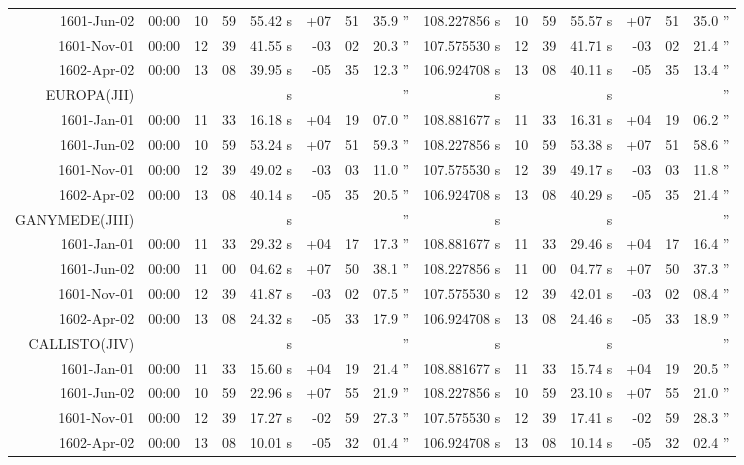 \begin{longtable}{r@{\,}r|r@{h}r@{m}r<{s}|r@{°}r@{'}r<{''}|r<{s}||r@{h}r@{m}r<{s}|r@{°}r@{'}r<{''}}
 1601-Jun-02 &00:00   &  10 & 59 & 55.42 & +07 & 51 & 35.9  &   108.227856 & 10&59&55.57 & +07&51&35.0 \\ %
 1601-Nov-01 &00:00   &  12 & 39 & 41.55 & -03 & 02 & 20.3  &   107.575530 & 12&39&41.71 & -03&02&21.4 \\ %
 1602-Apr-02 &00:00   &  13 & 08 & 39.95 & -05 & 35 & 12.3  &   106.924708 & 13&08&40.11 & -05&35&13.4 \\ %
EUROPA(JII)\\  
 1601-Jan-01 &00:00   &  11 & 33 & 16.18 & +04 & 19 & 07.0  &   108.881677 & 11&33&16.31 & +04&19&06.2 \\ %
 1601-Jun-02 &00:00   &  10 & 59 & 53.24 & +07 & 51 & 59.3  &   108.227856 & 10&59&53.38 & +07&51&58.6 \\ %
 1601-Nov-01 &00:00   &  12 & 39 & 49.02 & -03 & 03 & 11.0  &   107.575530 & 12&39&49.17 & -03&03&11.8 \\ %
 1602-Apr-02 &00:00   &  13 & 08 & 40.14 & -05 & 35 & 20.5  &   106.924708 & 13&08&40.29 & -05&35&21.4 \\ %
GANYMEDE(JIII)\\  
 1601-Jan-01 &00:00   &  11 & 33 & 29.32 & +04 & 17 & 17.3  &   108.881677 & 11&33&29.46 & +04&17&16.4 \\ %
 1601-Jun-02 &00:00   &  11 & 00 & 04.62 & +07 & 50 & 38.1  &   108.227856 & 11&00&04.77 & +07&50&37.3 \\ %
 1601-Nov-01 &00:00   &  12 & 39 & 41.87 & -03 & 02 & 07.5  &   107.575530 & 12&39&42.01 & -03&02&08.4 \\ %
 1602-Apr-02 &00:00   &  13 & 08 & 24.32 & -05 & 33 & 17.9  &   106.924708 & 13&08&24.46 & -05&33&18.9 \\ %
CALLISTO(JIV)\\  
 1601-Jan-01 &00:00   &  11 & 33 & 15.60 & +04 & 19 & 21.4  &   108.881677 & 11&33&15.74 & +04&19&20.5 \\ %
 1601-Jun-02 &00:00   &  10 & 59 & 22.96 & +07 & 55 & 21.9  &   108.227856 & 10&59&23.10 & +07&55&21.0 \\ %
 1601-Nov-01 &00:00   &  12 & 39 & 17.27 & -02 & 59 & 27.3  &   107.575530 & 12&39&17.41 & -02&59&28.3 \\ %
 1602-Apr-02 &00:00   &  13 & 08 & 10.01 & -05 & 32 & 01.4  &   106.924708 & 13&08&10.14 & -05&32&02.4 \\ %
\end{longtable}
